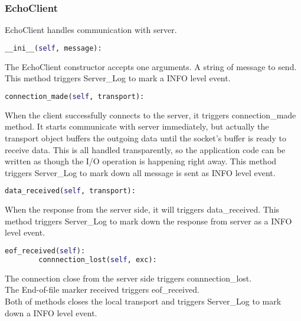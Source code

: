 \documentclass[10pt, a4paper]{IEEEtran}
\begin{document}
    \subsubsection{EchoClient}
    EchoClient handles communication with server.
    \begin{lstlisting}[language=python, frame=single, basicstyle=\footnotesize] 
        __ini__(self, message):
    \end{lstlisting} 
    The EchoClient constructor accepts one arguments. A string of message to send. This method triggers Server\_Log to mark a INFO level event.\\
    \begin{lstlisting}[language=python, frame=single, basicstyle=\footnotesize] 
        connection_made(self, transport):
    \end{lstlisting}
    When the client successfully connects to the server, it triggers connection\_made method. It starts communicate with server immediately, but actually the transport object buffers the outgoing data until the socket's buffer is ready to receive data. This is all handled transparently, so the application code can be written as though the I/O operation is happening right away. This method triggers Server\_Log to mark down all message is sent as INFO level event.\\
    \begin{lstlisting}[language=python, frame=single, basicstyle=\footnotesize] 
        data_received(self, transport):
    \end{lstlisting}
    When the response from the server side, it will triggers data\_received. This method triggers Server\_Log to mark down the response from server as a INFO level event.
    \begin{lstlisting}[language=python, frame=single, basicstyle=\footnotesize] 
        eof_received(self):
        connnection_lost(self, exc):
    \end{lstlisting}
    The connection close from the server side triggers connnection\_lost.\\
    The End-of-file marker received triggers eof\_received.\\
    Both of methods closes the local transport and triggers Server\_Log to mark down a INFO level event.\\
\end{document}
